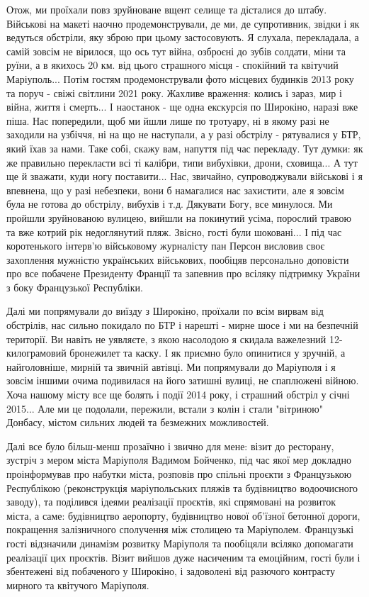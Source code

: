Отож, ми проїхали повз
зруйноване вщент селище та дісталися до штабу. Військові на макеті наочно
продемонстрували, де ми, де супротивник, звідки і як ведуться обстріли, яку
зброю при цьому застосовують. Я слухала, перекладала, а самій зовсім не
вірилося, що ось тут війна, озброєні до зубів солдати, міни та руїни, а в
якихось 20 км. від цього страшного місця - спокійний та квітучий Маріуполь...
Потім гостям продемонстрували фото місцевих будинків 2013 року та поруч - свіжі
світлини 2021 року. Жахливе враження: колись і зараз, мир і війна, життя і
смерть... І наостанок - ще одна екскурсія по Широкіно, наразі вже піша. Нас
попередили, щоб ми йшли лише по тротуару, ні в якому разі не заходили на
узбіччя, ні на що не наступали, а у разі обстрілу - рятувалися у БТР, який їхав
за нами. Таке собі, скажу вам, напуття під час перекладу. Тут думки: як же
правильно перекласти всі ті калібри, типи вибухівки, дрони, сховища... А тут ще
й зважати, куди ногу поставити... Нас, звичайно, супроводжували військові і я
впевнена, що у разі небезпеки, вони б намагалися нас захистити, але я зовсім
була не готова до обстрілу, вибухів і т.д. Дякувати Богу, все минулося. Ми
пройшли зруйнованою вулицею, вийшли на покинутий усіма, порослий травою та вже
котрий рік недоглянутий пляж. Звісно, гості були шоковані... І під час
коротенького інтерв'ю військовому журналісту пан Персон висловив своє
захоплення мужністю українських військових, пообіцяв персонально доповісти про
все побачене Президенту Франції та запевнив про всіляку підтримку України з
боку Французької Республіки. 


Далі ми попрямували до виїзду з Широкіно, проїхали по всім вирвам від
обстрілів, нас сильно покидало по БТР і нарешті - мирне шосе і ми на безпечній
території. Ви навіть не уявляєте, з якою насолодою я скидала важелезний
12-килограмовий бронежилет та каску. І як приємно було опинитися у зручній, а
найголовніше, мирній та звичній автівці. Ми попрямували до Маріуполя і я зовсім
іншими очима подивилася на його затишні вулиці, не спаплюжені війною. Хоча
нашому місту все ще болять і події 2014 року, і страшний обстріл у січні
2015... Але ми це подолали, пережили, встали з колін і стали "вітриною"
Донбасу, містом сильних людей та безмежних можливостей. 

Далі все було більш-менш прозаїчно і звично для мене: візит до ресторану,
зустріч з мером міста Маріуполя Вадимом Бойченко, під час якої мер докладно
проінформував про набутки міста, розповів про спільні проєкти з Французькою
Республікою (реконструкція маріупольських пляжів та будівництво водоочисного
заводу), та поділився ідеями реалізації проєктів, які спрямовані на розвиток
міста, а саме: будівництво аеропорту, будівництво нової об’їзної бетонної
дороги, покращення залізничного сполучення між столицею та Маріуполем.
Французькі гості відзначили динамізм розвитку Маріуполя та пообіцяли всіляко
допомагати реалізації цих проєктів. Візит вийшов дуже насиченим та емоційним,
гості були і збентежені від побаченого у Широкіно, і задоволені від разючого
контрасту мирного та квітучого Маріуполя. 

